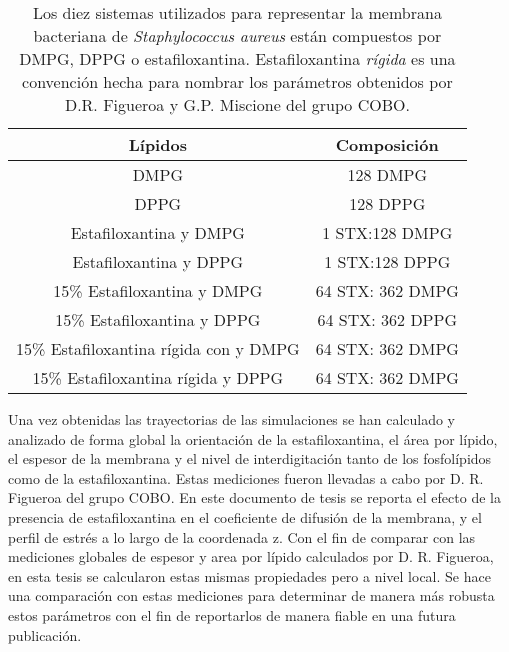 \begin{table}[h]
    \centering
    \begin{tabular}{|c|c|}\hline
        \textbf{L\'{i}pidos} & \textbf{Composici\'{o}n} \\\hline
        DMPG &128 DMPG \\
        DPPG &128 DPPG \\
        Estafiloxantina y DMPG &1 STX:128 DMPG \\
        Estafiloxantina y DPPG  &1 STX:128 DPPG\\
         15\% Estafiloxantina y DMPG &64 STX: 362 DMPG\\
         15\% Estafiloxantina y DPPG&64 STX: 362 DPPG\\
         15\% Estafiloxantina r\'{i}gida con y DMPG&64 STX: 362 DMPG\\
         15\% Estafiloxantina r\'{i}gida y DPPG&64 STX: 362 DMPG\\ \hline
    \end{tabular}
    \caption{Los diez sistemas utilizados para representar la membrana bacteriana de \textit{Staphylococcus aureus} est\'{a}n compuestos por DMPG, DPPG o estafiloxantina. Estafiloxantina \textit{r\'{i}gida} es una convenci\'{o}n hecha para nombrar los par\'{a}metros obtenidos por D.R. Figueroa y G.P. Miscione del grupo COBO.}
    \label{tab:my_label}
\end{table}

Una vez obtenidas las trayectorias de las simulaciones se han calculado y analizado de forma global la orientaci\'{o}n de la estafiloxantina, el \'{a}rea por l\'{i}pido, el espesor de la membrana y el nivel de interdigitaci\'{o}n tanto de los fosfol\'{i}pidos como de la estafiloxantina. Estas mediciones fueron llevadas a cabo por D. R. Figueroa del grupo COBO. En este documento de tesis se reporta el efecto de la presencia de estafiloxantina en el coeficiente de difusi\'{o}n de la membrana, y el perfil de estr\'{e}s a lo largo de la coordenada z. Con el fin de comparar con las mediciones globales de espesor y area por l\'{i}pido calculados por D. R. Figueroa, en esta tesis se calcularon estas mismas propiedades pero a nivel local. Se hace una comparaci\'{o}n con estas mediciones para determinar de manera m\'{a}s robusta estos par\'{a}metros con el fin de reportarlos de manera fiable en una futura publicaci\'{o}n.
